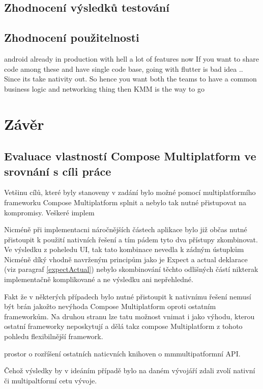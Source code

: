 

\section{Zhodnocení výsledků testování}

\section{Zhodnocení použitelnosti}

android already in production with hell a lot of features now If you want to share code among these and have single code base, going with flutter is bad idea .. Since its take nativity out. So hence you want both the teams to have a common business logic and networking thing then KMM is the way to go 

\chapter{Závěr}

\section{Evaluace vlastností Compose Multiplatform ve srovnání s cíli práce}
Vetšinu cílů, které byly stanoveny v zadání bylo možné pomocí multiplatformího frameworku Compose Multiplatform splnit a nebylo tak
nutné přistupovat na kompromisy. Veškeré implem

Nicméně při implementacni náročnějších částech aplikace bylo již občas nutné přistoupit k použití nativních řešení a tím pádem tyto dva přístupy zkombinovat.
Ve výsledku z poheledu UI, tak tato kombinace nevedla k zádným ústupkům
Nicméně díký vhodně navrženým principům jako je Expect a actual deklarace (viz paragraf \ref{expectActual}) nebylo skombinování těchto odlišných částí nikterak
implementačně komplikované a ne výsledku ani nepřehledné. 

Fakt že v některých případech bylo nutné přistoupit k nativnímu řešení nemusí být brán jakožto nevýhoda Compose Multiplatform oproti ostatním frameworkům.
Na druhou stranu lze tatu možnost vnimat i jako výhodu, kterou ostatní frameworky neposkytují a dělá takz compose Multiplatform z tohoto pohledu flexibilnější
framework.

prostor o rozříšení ostatních naticvních knihoven o mmmultipatformní API. 

Čehož výsledky by v ideáním případě bylo na daném vývojáří zdali zvolí nativní či multipaltformí cetu vývoje. 

